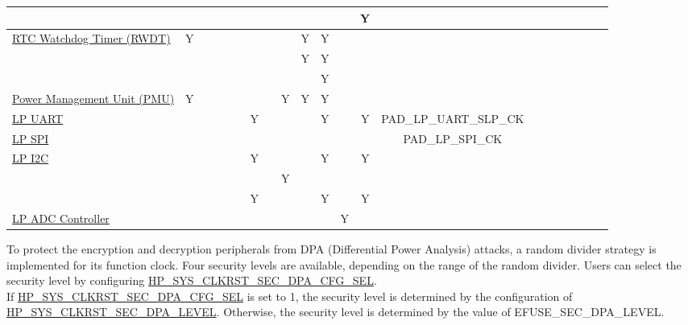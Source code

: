\documentclass[main\_\_EN.tex]{subfiles}
\begin{document}
\begin{landscape}
\begin{tiny}
\begin{longtable}[c]{|m{2.1cm}|c|c|c|c|c|c|c|c|c|c|c|c|c|c|c|c|c|c|c|c| }
    \nameref{mod:efuse} &   &   &   &   &   &   &   &   &   &   & & Y &  \\ \hline
    \hyperref[mod:wdt]{RTC Watchdog Timer (RWDT)} & Y &   &   &   &   &   &   &   & Y & Y &  &  &   \\ \hline
    \nameref{mod:rtctimer} &   &   &   &   &   &   &   &   & Y & Y &  &  &   \\ \hline
    \nameref{mod:brownout} &   &   &   &   &   &   &   &   &   & Y &  &  &  \\ \hline
    \hyperref[mod:lowpowm]{Power Management Unit (PMU)} & Y &   &   &   &   &   &   & Y & Y & Y &  &  &  \\ \hline
    \hyperref[mod:uart]{LP UART} &   &   &   &   &   & Y &   &   &   & Y &  & Y & PAD\_LP\_UART\_SLP\_CK \\ \hline
    \hyperref[mod:spi]{LP SPI} &   &   &   &   &   &   &   &   &   &   & &   & PAD\_LP\_SPI\_CK \\ \hline
    \hyperref[mod:i2c]{LP I2C} &   &   &   &   &   & Y &   &   &   & Y & &  Y &  \\ \hline
    \nameref{mod:anai2c} &   &   &   &   &   &   &   & Y &   &   &  &  &  \\ \hline
    \nameref{mod:lpi2s} &   &   &   &   &   & Y &   &   &   & Y & & Y &  \\ \hline
    \hyperref[mod:adc]{LP ADC Controller} &   &   &   &   &   &   &   &   &   &   & Y &   &  \\ \hline
\end{longtable}
\end{tiny}

\end{landscape}

\begin{tiplisting}
To protect the encryption and decryption peripherals from DPA (Differential Power Analysis) attacks, a random divider strategy is implemented for its function clock. Four security levels are available, depending on the range of the random divider. Users can select the security level by configuring \hyperref[fielddesc:HPSYSCLKRSTSECDPACFGSEL]{HP\_SYS\_CLKRST\_SEC\_DPA\_CFG\_SEL}. \\If \hyperref[fielddesc:HPSYSCLKRSTSECDPACFGSEL]{HP\_SYS\_CLKRST\_SEC\_DPA\_CFG\_SEL} is set to 1, the security level is determined by the configuration of \\\hyperref[fielddesc:HPSYSCLKRSTSECDPALEVEL]{HP\_SYS\_CLKRST\_SEC\_DPA\_LEVEL}. Otherwise, the security level is determined by the value of EFUSE\_SEC\_DPA\_LEVEL.
\end{tiplisting}
\end{document}
